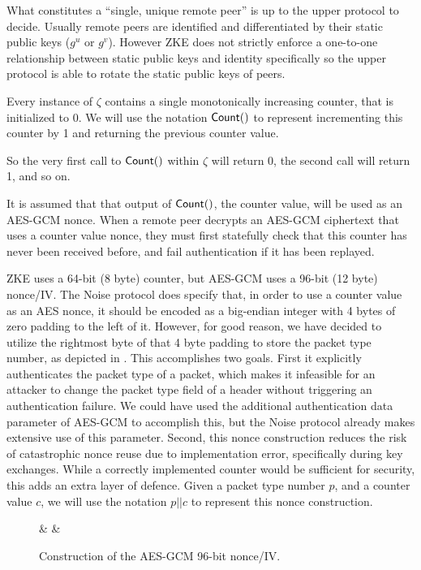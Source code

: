 \documentclass{article}
\begin{document}
What constitutes a ``single, unique remote peer'' is up to the upper protocol to decide. Usually remote peers are identified and differentiated by their static public keys ($g^u$ or $g^v$). However ZKE does not strictly enforce a one-to-one relationship between static public keys and identity specifically so the upper protocol is able to rotate the static public keys of peers.

\begin{definition}
	Every instance of $\zeta$ contains a single monotonically increasing counter, that is initialized to 0. We will use the notation $\text{\sf Count}()$ to represent incrementing this counter by 1 and returning the previous counter value.

	So the very first call to $\text{\sf Count}()$ within $\zeta$ will return 0, the second call will return 1, and so on.

	It is assumed that that output of $\text{\sf Count}()$, the counter value, will be used as an AES-GCM nonce. When a remote peer decrypts an AES-GCM ciphertext that uses a counter value nonce, they must first statefully check that this counter has never been received before, and fail authentication if it has been replayed.
\end{definition}

ZKE uses a 64-bit (8 byte) counter, but AES-GCM uses a 96-bit (12 byte) nonce/IV. The Noise protocol does specify that, in order to use a counter value as an AES nonce, it should be encoded as a big-endian integer with 4 bytes of zero padding to the left of it. However, for good reason, we have decided to utilize the rightmost byte of that 4 byte padding to store the packet type number, as depicted in . This accomplishes two goals. First it explicitly authenticates the packet type of a packet, which makes it infeasible for an attacker to change the packet type field of a header without triggering an authentication failure. We could have used the additional authentication data parameter of AES-GCM to accomplish this, but the Noise protocol already makes extensive use of this parameter. Second, this nonce construction reduces the risk of catastrophic nonce reuse due to implementation error, specifically during key exchanges. While a correctly implemented counter would be sufficient for security, this adds an extra layer of defence. Given a packet type number $p$, and a counter value $c$, we will use the notation $p||c$ to represent this nonce construction.

\begin{figure}
	\caption{Construction of the AES-GCM 96-bit nonce/IV.}\label{fig:nonce}
	\centering
	\begin{bytefield}[bitwidth=3.5em]{10}
		 &
		 &
	\end{bytefield}
\end{figure}
\end{document}
